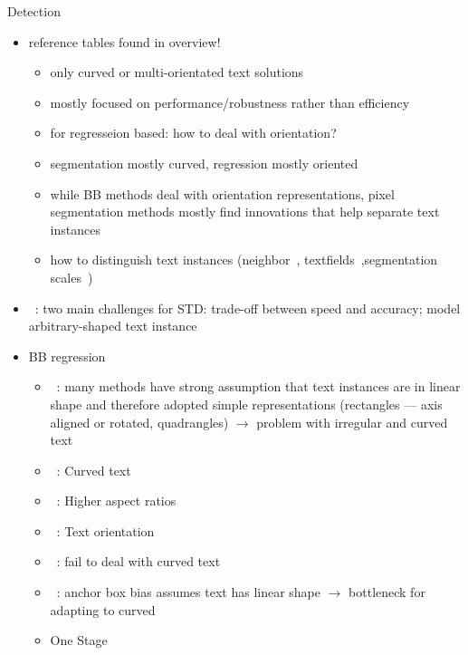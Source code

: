 Detection
\begin{itemize}
    \item reference tables found in overview!
        \begin{itemize}
            \item only curved or multi-orientated text solutions
            \item mostly focused on performance/robustness rather than efficiency
            \item for regresseion based: how to deal with orientation?
            \item segmentation mostly curved, regression mostly oriented
            \item while BB methods deal with orientation representations, pixel segmentation methods
                mostly find innovations that help separate text instances
            \item how to distinguish text instances (neighbor~\citep{deng_pixellink_2018},
                textfields~\citep{xu_textfield_2019},segmentation scales~\citep{wang_shape_2019})
        \end{itemize}
    \item~\cite{wang_efficient_2019}: two main challenges for \ac{STD}:
        trade-off between speed and accuracy; model arbitrary-shaped text instance
    \item BB regression
        \begin{itemize}
            \item~\cite{ferrari_textsnake_2018}: many methods have strong assumption that text
                instances are in linear shape and therefore adopted simple representations
                (rectangles --- axis aligned or rotated, quadrangles)
                $\rightarrow$ problem with irregular and curved text
            \item~\citep{long_scene_2021}: Curved text
            \item~\cite{long_scene_2021,shi_detecting_2017}: Higher aspect ratios
            \item~\cite{shi_detecting_2017}: Text orientation
            \item~\cite{wang_shape_2019}: fail to deal with curved text
            \item~\cite{xu_textfield_2019}: anchor box bias assumes text has linear shape
                $\rightarrow$ bottleneck for adapting to curved
            \item One Stage

\end{itemize}
\end{itemize}
